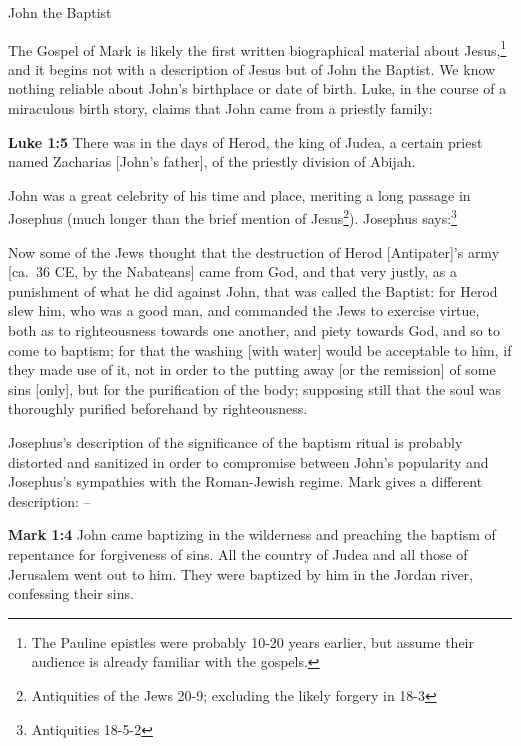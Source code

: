 \documentclass[10pt,twoside]{article} %
\newcommand{\quotesize}{\normalsize{}}
\newcommand{\comm}[1]{\begingroup \color{black!50} #1\endgroup}
\newenvironment{quotetext}{\begingroup\quotesize}{\endgroup}
\newcommand{\bible}[2]{\begin{quotetext}\textbf{#1} #2\end{quotetext}}
\newcommand{\gospelmark}[2]{\bible{Mark #1}{#2}}
\newcommand{\luke}[2]{\bible{Luke #1}{#2}}
\begin{document}
\begin{section}{John the Baptist}

\comm{The Gospel of Mark is likely the first written biographical material about Jesus,\footnote{The Pauline epistles were probably 10-20 years
earlier, but assume their audience is already familiar with the gospels.}
and it begins not with a description of Jesus but of John the Baptist.
We know nothing reliable about John's birthplace or date of birth. Luke, in the course of a miraculous birth story, claims that
John came from a priestly family:}

\luke{1:5}{There was in the days of Herod, the king of Judea, a certain priest named Zacharias [John's father], of the priestly division of Abijah.}

\comm{
John was a great celebrity of his time and place, meriting a long passage in
Josephus (much longer than the brief mention of Jesus\footnote{Antiquities of the Jews 20-9;
excluding the likely forgery in 18-3}).
Josephus says:\footnote{Antiquities 18-5-2} %
}

\begin{quotetext}
Now some of the Jews thought that the destruction of Herod [Antipater]'s army [ca.~36 CE, by the Nabateans] came
from God, and that very justly, as a punishment of what he did against
John, that was called the Baptist: for Herod slew him, who was a good
man, and commanded the Jews to exercise virtue, both as to
righteousness towards one another, and piety towards God, and so to
come to baptism; for that the washing [with water] would be acceptable
to him, if they made use of it, not in order to the putting away [or
the remission] of some sins [only], but for the purification of the
body; supposing still that the soul was thoroughly purified beforehand
by righteousness.
\end{quotetext}

\comm{
Josephus's description of the significance of the baptism ritual is probably
distorted and sanitized in order to compromise between John's popularity and Josephus's sympathies
with the Roman-Jewish regime. Mark gives a different description: --
}

\gospelmark{1:4}{John came baptizing in the wilderness and preaching the
baptism of repentance for forgiveness of sins.  All the country of
Judea and all those of Jerusalem went out to him. They were baptized
by him in the Jordan river, confessing their sins.}


\end{section}
\end{document}
